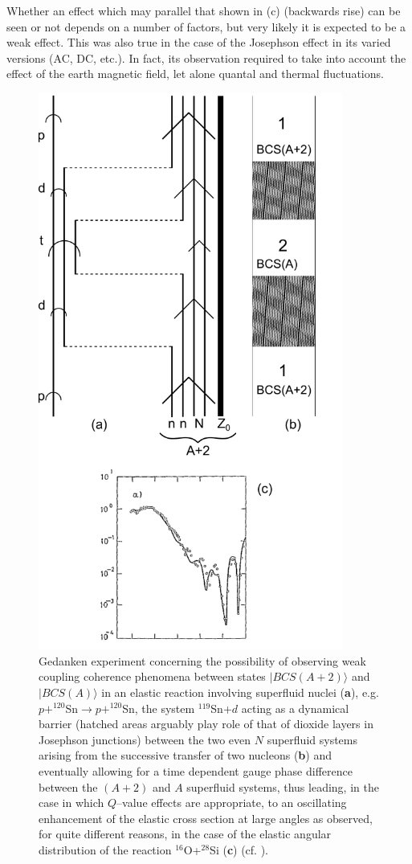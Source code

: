 Whether an effect which may parallel that shown in (c) (backwards rise) can be seen or not depends on a number of factors, but very likely it is expected to be a weak effect. This was also true in the case of  the Josephson effect in its varied versions (AC, DC, etc.). In fact, its observation required  to take into account the effect of the earth magnetic field, let alone quantal and thermal fluctuations.




\begin{figure}\centerline{\includegraphics*[width=10cm,angle=0]{nutshell/figs/fig3D1.pdf}}
\caption{Gedanken experiment concerning the possibility of observing weak coupling coherence phenomena between states $|BCS(A+2)\rangle$ and $|BCS(A)\rangle$ in an elastic reaction involving superfluid nuclei (\textbf{a}), e.g. $p+^{120}$Sn$\rightarrow p+^{120}$Sn, the system $^{119}$Sn+$d$ acting as a dynamical barrier (hatched areas arguably play role of that of dioxide layers in Josephson junctions) between the two even $N$ superfluid systems arising from the successive transfer of two nucleons (\textbf{b}) and eventually allowing for  a time dependent gauge phase difference between the $(A+2)$ and $A$ superfluid systems, thus leading, in the case in which $Q$--value effects are appropriate, to an oscillating enhancement of the elastic cross section at large angles as observed, for quite different reasons, in the case of the elastic angular distribution of the reaction $^{16}$O+$^{28}$Si (\textbf{c}) (cf. \cite{Pollarolo:84}).}\label{fig3.C.1}
\end{figure}

